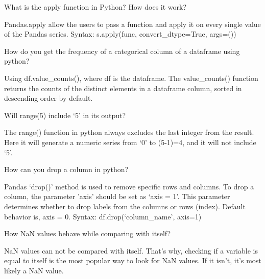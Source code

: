 	\begin{qanda}
		\begin{question}
What is the apply function in Python? How does it work?
		\end{question}
		\begin{answer}
Pandas.apply allow the users to pass a function and apply it on every single value of the Pandas series. Syntax: s.apply(func, convert\_dtype=True, args=())
		\end{answer}
	\end{qanda}

	\begin{qanda}
		\begin{question}
How do you get the frequency of a categorical column of a dataframe using python?
		\end{question}
		\begin{answer}
Using df.value\_counts(), where df is the dataframe. The value\_counts() function returns the counts of the distinct elements in a dataframe column, sorted in descending order by default.
		\end{answer}
	\end{qanda}

	\begin{qanda}
		\begin{question}
Will range(5) include `5' in its output?
		\end{question}
		\begin{answer}
The range() function in python always excludes the last integer from the result. Here it will generate a numeric series from `0' to (5-1)=4, and it will not include `5'.
		\end{answer}
	\end{qanda}

	\begin{qanda}
		\begin{question}
How can you drop a column in python?
		\end{question}
		\begin{answer}
Pandas `drop()' method is used to remove specific rows and columns. To drop a column, the parameter 'axis' should be set as `axis = 1'. This parameter determines whether to drop labels from the columns or rows (index). Default behavior is, axis = 0. Syntax: df.drop(`column\_name', axis=1)
		\end{answer}
	\end{qanda}

	\begin{qanda}
		\begin{question}
How NaN values behave while comparing with itself?
		\end{question}
		\begin{answer}
NaN values can not be compared with itself. That's why, checking if a variable is equal to itself is the most popular way to look for NaN values. If it isn't, it's most likely a NaN value.
		\end{answer}
	\end{qanda}

